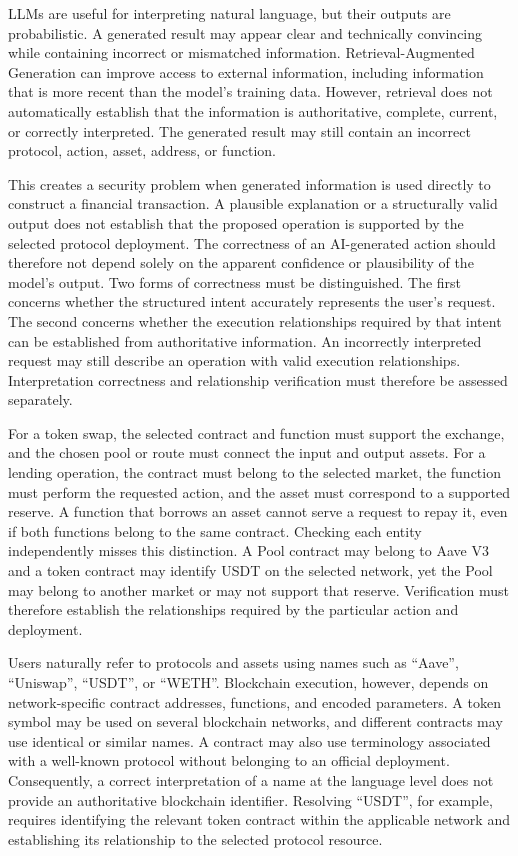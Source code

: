LLMs are useful for interpreting natural language, but their outputs
are probabilistic. A generated result may appear clear and technically
convincing while containing incorrect or mismatched information.
Retrieval-Augmented Generation can improve access to external
information, including information that is more recent than the model's
training data. However, retrieval does not automatically establish that
the information is authoritative, complete, current, or correctly
interpreted. The generated result may still contain an incorrect
protocol, action, asset, address, or function.

This creates a security problem when generated information is used
directly to construct a financial transaction. A plausible explanation
or a structurally valid output does not establish that the proposed
operation is supported by the selected protocol deployment. The
correctness of an AI-generated action should therefore not depend
solely on the apparent confidence or plausibility of the model's output. Two forms of correctness must be distinguished. The first concerns
whether the structured intent accurately represents the user's request.
The second concerns whether the execution relationships required by
that intent can be established from authoritative information. An
incorrectly interpreted request may still describe an operation with
valid execution relationships. Interpretation correctness and
relationship verification must therefore be assessed separately.


For a token swap, the selected contract and function must support the
exchange, and the chosen pool or route must connect the input and output
assets. For a lending operation, the contract must belong to the selected
market, the function must perform the requested action, and the asset must
correspond to a supported reserve. A function that borrows an asset cannot
serve a request to repay it, even if both functions belong to the same
contract. Checking each entity independently misses this distinction. A Pool contract
may belong to Aave V3 and a token contract may identify USDT on the
selected network, yet the Pool may belong to another market or may not
support that reserve. Verification must therefore establish the
relationships required by the particular action and deployment.

Users naturally refer to protocols and assets using names such as
``Aave'', ``Uniswap'', ``USDT'', or ``WETH''. Blockchain execution,
however, depends on network-specific contract addresses, functions,
and encoded parameters. A token symbol may be used on several
blockchain networks, and different contracts may use identical or
similar names. A contract may also use terminology associated with a
well-known protocol without belonging to an official deployment. Consequently, a correct interpretation of a name at the language level
does not provide an authoritative blockchain identifier. Resolving
``USDT'', for example, requires identifying the relevant token contract
within the applicable network and establishing its relationship to
the selected protocol resource.

